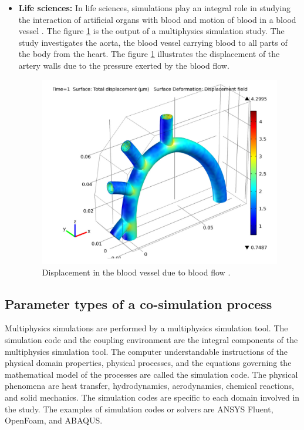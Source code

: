 \begin{itemize}
\item \textbf{Life sciences:} In life sciences, simulations play an integral role in studying the interaction of artificial organs with blood and motion of blood in a blood vessel \cite{Blood-vessel}. The figure \ref{Fig:Blood-vessel} is the output of a multiphysics simulation study. The study investigates the aorta, the blood vessel carrying blood to all parts of the body from the heart. The figure \ref{Fig:Blood-vessel} illustrates the displacement of the artery walls due to the pressure exerted by the blood flow.
\begin{figure}[!ht]
\centering
\includegraphics[width=\textwidth]{images/blood-vessel.png}
\captionsetup{justification=justified}
\caption[Displacement in the blood vessel due to blood flow]{Displacement in the blood vessel due to blood flow \cite{Blood-vessel}.}
\label{Fig:Blood-vessel}
\end{figure}
\end{itemize}

\subsection{Parameter types of a co-simulation process}
Multiphysics simulations are performed by a multiphysics simulation tool. The simulation code and the coupling environment are the integral components of the multiphysics simulation tool. The computer understandable instructions of the physical domain properties, physical processes, and the equations governing the mathematical model of the processes are called the simulation code. The physical phenomena are heat transfer, hydrodynamics, aerodynamics, chemical reactions, and solid mechanics. The simulation codes are specific to each domain involved in the study. The examples of simulation codes or solvers are ANSYS Fluent, OpenFoam, and ABAQUS.

